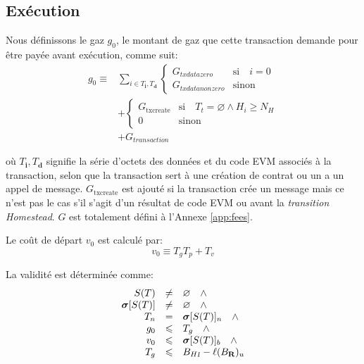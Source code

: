\documentclass[9pt,oneside]{amsart}
\newcommand{\firsthomesteadblock}{\ensuremath{N_H}}
\begin{document}
\begin{multicols}{2}
\subsection{Exécution}
Nous définissons le gaz $g_0$, le montant de gaz que cette transaction demande pour être payée avant exécution, comme suit:
\begin{align}
g_0 \equiv {} & \sum_{i \in T_\mathbf{i}, T_\mathbf{d}} \begin{cases} G_{txdatazero} & \text{si} \quad i = 0 \\ G_{txdatanonzero} & \text{sinon} \end{cases} \\
{} & + \begin{cases} G_\text{txcreate} & \text{si} \quad T_t = \varnothing \wedge H_i \geq \firsthomesteadblock \\ 0 & \text{sinon} \end{cases} \\
{} & + G_{transaction}
\end{align}

où $T_\mathbf{i},T_\mathbf{d}$ signifie la série d'octets des données et du code EVM associés à la transaction, selon que la transaction sert à une création de contrat ou un a un appel de message. $G_\text{txcreate}$ est ajouté si la transaction crée un message mais ce n'est pas le cas s'il s'agit d'un résultat de code EVM ou avant la {\it transition Homestead}. $G$ est totalement défini à l'Annexe  \ref{app:fees}.


Le coût de départ $v_0$ est calculé par:
\begin{equation}
v_0 \equiv T_g T_p + T_v
\end{equation}

La validité est déterminée comme:
\begin{equation}
\begin{array}[t]{rcl}
S(T) & \neq & \varnothing \quad \wedge \\
\boldsymbol{\sigma}[S(T)] & \neq & \varnothing \quad \wedge \\
T_n & = & \boldsymbol{\sigma}[S(T)]_n \quad \wedge \\
g_0 & \leqslant & T_g \quad \wedge \\
v_0 & \leqslant & \boldsymbol{\sigma}[S(T)]_b \quad \wedge \\
T_g & \leqslant & {B_H}_l - \ell(B_\mathbf{R})_u
\end{array}
\end{equation}


\end{multicols}
\end{document}
